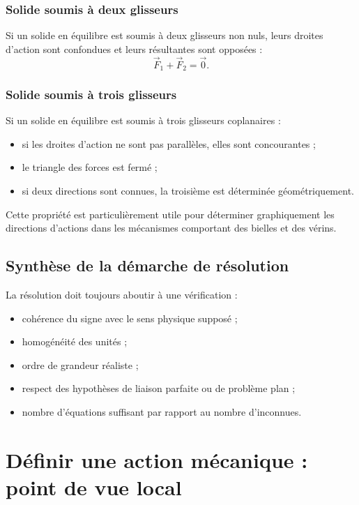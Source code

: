 \subsubsection{Solide soumis à deux glisseurs}

Si un solide en équilibre est soumis à deux glisseurs non nuls, leurs droites d'action sont confondues et leurs résultantes sont opposées :
\[
\vec F_1+\vec F_2=\vec 0.
\]

\subsubsection{Solide soumis à trois glisseurs}

Si un solide en équilibre est soumis à trois glisseurs coplanaires :
\begin{itemize}
  \item si les droites d'action ne sont pas parallèles, elles sont concourantes ;
  \item le triangle des forces est fermé ;
  \item si deux directions sont connues, la troisième est déterminée géométriquement.
\end{itemize}

Cette propriété est particulièrement utile pour déterminer graphiquement les directions d'actions dans les mécanismes comportant des bielles et des vérins.

\subsection{Synthèse de la démarche de résolution}

La résolution doit toujours aboutir à une vérification :
\begin{itemize}
  \item cohérence du signe avec le sens physique supposé ;
  \item homogénéité des unités ;
  \item ordre de grandeur réaliste ;
  \item respect des hypothèses de liaison parfaite ou de problème plan ;
  \item nombre d'équations suffisant par rapport au nombre d'inconnues.
\end{itemize}

\section{Définir une action mécanique : point de vue local}

